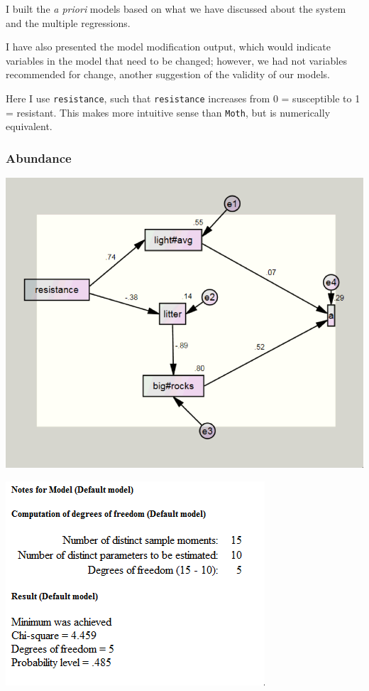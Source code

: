 \documentclass[a4paper]{article}
\begin{document}
\begin{description}
\item I built the \textit{a priori} models based on what we have discussed about the system and the multiple regressions. 

\item I have also presented the model modification output, which would indicate variables in the model that need to be changed; however, we had not variables recommended for change, another suggestion of the validity of our models. 

\item Here I use \texttt{resistance}, such that \texttt{resistance} increases from 0 = susceptible to 1 = resistant. This makes more intuitive sense than \texttt{Moth}, but is numerically equivalent.

\end{description}


\subsubsection{Abundance}

\includegraphics[]{A_SEMpathdia.png}

\includegraphics[]{A_SEMnotes.png}
\end{document}
